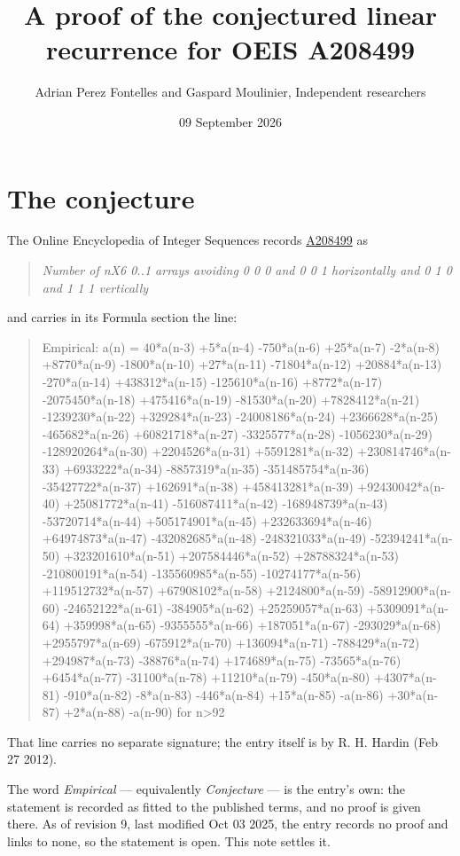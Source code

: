 \documentclass[11pt]{article}
\title{A proof of the conjectured linear recurrence for OEIS A208499}
\author{Adrian Perez Fontelles and Gaspard Moulinier, Independent researchers}
\date{09 September 2026}
\theoremstyle{definition}
\begin{document}
\maketitle
\section{The conjecture}

The Online Encyclopedia of Integer Sequences records \href{https://oeis.org/A208499}{A208499} as

\begin{quote}\itshape Number of nX6 0..1 arrays avoiding 0 0 0 and 0 0 1 horizontally and 0 1 0 and 1 1 1 vertically\end{quote}

and carries in its Formula section the line:

\begin{quote}\ttfamily Empirical: a(n) = 40*a(n-3) +5*a(n-4) -750*a(n-6) +25*a(n-7) -2*a(n-8) +8770*a(n-9) -1800*a(n-10) +27*a(n-11) -71804*a(n-12) +20884*a(n-13) -270*a(n-14) +438312*a(n-15) -125610*a(n-16) +8772*a(n-17) -2075450*a(n-18) +475416*a(n-19) -81530*a(n-20) +7828412*a(n-21) -1239230*a(n-22) +329284*a(n-23) -24008186*a(n-24) +2366628*a(n-25) -465682*a(n-26) +60821718*a(n-27) -3325577*a(n-28) -1056230*a(n-29) -128920264*a(n-30) +2204526*a(n-31) +5591281*a(n-32) +230814746*a(n-33) +6933222*a(n-34) -8857319*a(n-35) -351485754*a(n-36) -35427722*a(n-37) +162691*a(n-38) +458413281*a(n-39) +92430042*a(n-40) +25081772*a(n-41) -516087411*a(n-42) -168948739*a(n-43) -53720714*a(n-44) +505174901*a(n-45) +232633694*a(n-46) +64974873*a(n-47) -432082685*a(n-48) -248321033*a(n-49) -52394241*a(n-50) +323201610*a(n-51) +207584446*a(n-52) +28788324*a(n-53) -210800191*a(n-54) -135560985*a(n-55) -10274177*a(n-56) +119512732*a(n-57) +67908102*a(n-58) +2124800*a(n-59) -58912900*a(n-60) -24652122*a(n-61) -384905*a(n-62) +25259057*a(n-63) +5309091*a(n-64) +359998*a(n-65) -9355555*a(n-66) +187051*a(n-67) -293029*a(n-68) +2955797*a(n-69) -675912*a(n-70) +136094*a(n-71) -788429*a(n-72) +294987*a(n-73) -38876*a(n-74) +174689*a(n-75) -73565*a(n-76) +6454*a(n-77) -31100*a(n-78) +11210*a(n-79) -450*a(n-80) +4307*a(n-81) -910*a(n-82) -8*a(n-83) -446*a(n-84) +15*a(n-85) -a(n-86) +30*a(n-87) +2*a(n-88) -a(n-90) for n>92\end{quote}

That line carries no separate signature; the entry itself is by R. H. Hardin (Feb 27 2012).

The word {\itshape Empirical} --- equivalently {\itshape Conjecture} --- is the entry's own: the statement is recorded as fitted to the published terms, and no proof is given there. As of revision 9, last modified Oct 03 2025, the entry records no proof and links to none, so the statement is open. This note settles it.
\end{document}
